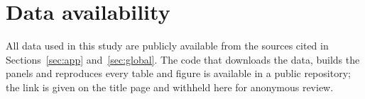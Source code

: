 \section*{Data availability}
All data used in this study are publicly available from the sources cited in Sections~\ref{sec:app} and~\ref{sec:global}. The code that downloads the data, builds the panels and reproduces every table and figure is available in a public repository; the link is given on the title page and withheld here for anonymous review.

